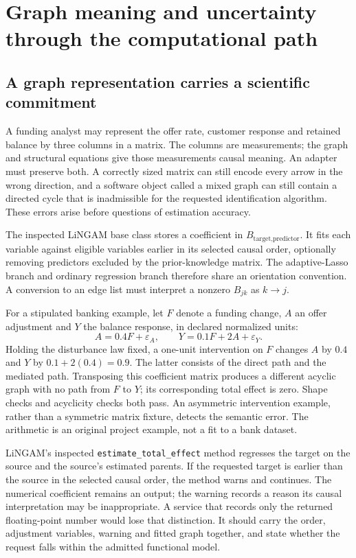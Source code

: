 \chapter{Graph meaning and uncertainty through the computational path}
\label{v131:graph-uncertainty}

\section{A graph representation carries a scientific commitment}

A funding analyst may represent the offer rate, customer response and retained
balance by three columns in a matrix. The columns are measurements; the graph
and structural equations give those measurements causal meaning. An adapter
must preserve both. A correctly sized matrix can still encode every arrow in
the wrong direction, and a software object called a mixed graph can still
contain a directed cycle that is inadmissible for the requested identification
algorithm. These errors arise before questions of estimation accuracy.

The inspected LiNGAM base class stores a coefficient in
$B_{\text{target},\text{predictor}}$. It fits each variable against eligible
variables earlier in its selected causal order, optionally removing predictors
excluded by the prior-knowledge matrix. The adaptive-Lasso branch and ordinary
regression branch therefore share an orientation convention. A conversion to
an edge list must interpret a nonzero $B_{jk}$ as $k\to j$.
\cite{v131_sw_lingam}

For a stipulated banking example, let $F$ denote a funding change, $A$ an offer
adjustment and $Y$ the balance response, in declared normalized units:
\[
 A=0.4F+\varepsilon_A,\qquad
 Y=0.1F+2A+\varepsilon_Y.
\]
Holding the disturbance law fixed, a one-unit intervention on $F$ changes $A$
by $0.4$ and $Y$ by $0.1+2(0.4)=0.9$. The latter consists of the direct path
and the mediated path. Transposing this coefficient matrix produces a different
acyclic graph with no path from $F$ to $Y$; its corresponding total effect is
zero. Shape checks and acyclicity checks both pass. An asymmetric intervention
example, rather than a symmetric matrix fixture, detects the semantic error.
The arithmetic is an original project example, not a fit to a bank dataset.
\cite{v131_project_semantics}

LiNGAM's inspected \texttt{estimate\_total\_effect} method regresses the target
on the source and the source's estimated parents. If the requested target is
earlier than the source in the selected causal order, the method warns and
continues. The numerical coefficient remains an output; the warning records a
reason its causal interpretation may be inappropriate. A service that records
only the returned floating-point number would lose that distinction. It should
carry the order, adjustment variables, warning and fitted graph together, and
state whether the request falls within the admitted functional model.
\cite{v131_sw_lingam}

